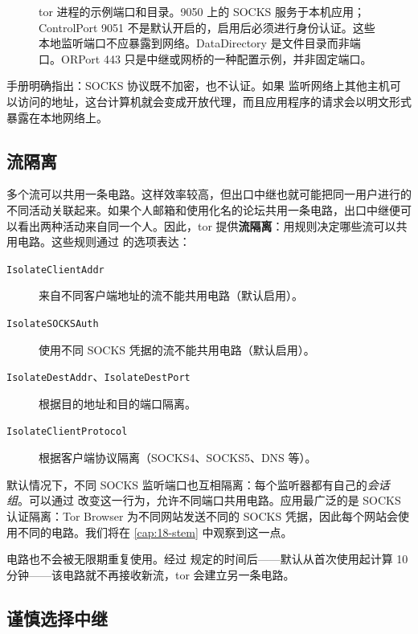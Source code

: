 \begin{figure}[htbp]
\centering

\caption{tor 进程的示例端口和目录。9050 上的 SOCKS 服务于本机应用；ControlPort 9051 不是默认开启的，启用后必须进行身份认证。这些本地监听端口不应暴露到网络。DataDirectory 是文件目录而非端口。ORPort 443 只是中继或网桥的一种配置示例，并非固定端口。}
\label{fig:porte}
\end{figure}

\begin{attenzione}
手册明确指出：SOCKS 协议既不加密，也不认证。如果  监听网络上其他主机可以访问的地址，这台计算机就会变成开放代理，而且应用程序的请求会以明文形式暴露在本地网络上。
\end{attenzione}

\subsection{流隔离}\label{sec:torrc-isolamento}

多个流可以共用一条电路。这样效率较高，但出口中继也就可能把同一用户进行的不同活动关联起来。如果个人邮箱和使用化名的论坛共用一条电路，出口中继便可以看出两种活动来自同一个人。因此，tor 提供\textbf{流隔离}：用规则决定哪些流可以共用电路。这些规则通过  的选项表达：
\begin{description}
  \item[\texttt{IsolateClientAddr}] 来自不同客户端地址的流不能共用电路（默认启用）。
  \item[\texttt{IsolateSOCKSAuth}] 使用不同 SOCKS 凭据的流不能共用电路（默认启用）。
  \item[\texttt{IsolateDestAddr}、\texttt{IsolateDestPort}] 根据目的地址和目的端口隔离。
  \item[\texttt{IsolateClientProtocol}] 根据客户端协议隔离（SOCKS4、SOCKS5、DNS 等）。
\end{description}
默认情况下，不同 SOCKS 监听端口也互相隔离：每个监听器都有自己的\emph{会话组}。可以通过  改变这一行为，允许不同端口共用电路。应用最广泛的是 SOCKS 认证隔离：Tor Browser 为不同网站发送不同的 SOCKS 凭据，因此每个网站会使用不同的电路。我们将在 \cref{cap:18-stem} 中观察到这一点。

电路也不会被无限期重复使用。经过  规定的时间后——默认从首次使用起计算 10 分钟——该电路就不再接收新流，tor 会建立另一条电路。

\subsection{谨慎选择中继}

